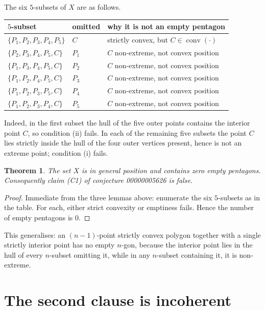 \documentclass[11pt]{article}
\newtheorem{theorem}{Theorem}
\theoremstyle{remark}
\begin{document}
The six $5$-subsets of $X$ are as follows.

\begin{center}
\begin{tabular}{lll}
\toprule
$5$-subset & omitted & why it is not an empty pentagon\\
\midrule
$\{P_1,P_2,P_3,P_4,P_5\}$ & $C$ & strictly convex, but $C\in\operatorname{conv}(\cdot)$\\
$\{P_2,P_3,P_4,P_5,C\}$ & $P_1$ & $C$ non-extreme, not convex position\\
$\{P_1,P_3,P_4,P_5,C\}$ & $P_2$ & $C$ non-extreme, not convex position\\
$\{P_1,P_2,P_4,P_5,C\}$ & $P_3$ & $C$ non-extreme, not convex position\\
$\{P_1,P_2,P_3,P_5,C\}$ & $P_4$ & $C$ non-extreme, not convex position\\
$\{P_1,P_2,P_3,P_4,C\}$ & $P_5$ & $C$ non-extreme, not convex position\\
\bottomrule
\end{tabular}
\end{center}

Indeed, in the first subset the hull of the five outer points contains the
interior point $C$, so condition (ii) fails.  In each of the remaining five
subsets the point $C$ lies strictly inside the hull of the four outer
vertices present, hence is not an extreme point; condition (i) fails.

\begin{theorem}
The set $X$ is in general position and contains zero empty pentagons.
Consequently claim (C1) of conjecture 00000005626 is false.
\end{theorem}

\begin{proof}
Immediate from the three lemmas above: enumerate the six $5$-subsets as in
the table.  For each, either strict convexity or emptiness fails.  Hence the
number of empty pentagons is $0$.
\end{proof}

This generalises: an $(n-1)$-point strictly convex polygon together with a
single strictly interior point has no empty $n$-gon, because the interior
point lies in the hull of every $n$-subset omitting it, while in any
$n$-subset containing it, it is non-extreme.

\section{The second clause is incoherent}
\end{document}
